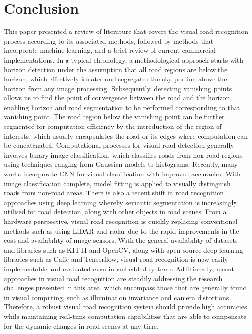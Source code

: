 \section{Conclusion} \label{secconclusion}
This paper presented a review of literature that covers the visual road recognition process according to its associated methods, followed by methods that incorporate machine learning, and a brief review of current commercial implementations. In a typical chronology, a methodological approach starts with horizon detection under the assumption that all road regions are below the horizon, which effectively isolates and segregates the sky portion above the horizon from any image processing. Subsequently, detecting vanishing points allows us to find the point of convergence between the road and the horizon, enabling horizon and road segmentation to be performed corresponding to that vanishing point. The road region below the vanishing point can be further segmented for computation efficiency by the introduction of the region of interests, which usually encapsulates the road or its edges where computation can be concatenated. Computational processes for visual road detection generally involves binary image classification, which classifies roads from non-road regions using techniques ranging from Gaussian models to histograms. Recently, many works incorporate CNN for visual classification with improved accuracies. With image classification complete, model fitting is applied to visually distinguish roads from non-road areas. There is also a recent shift in road recognition approaches using deep learning whereby semantic segmentation is increasingly utilised for road detection, along with other objects in road scenes. From a hardware perspective, visual road recognition is quickly replacing conventional methods such as using LiDAR and radar due to the rapid improvements in the cost and availability of image sensors. With the general availability of datasets and libraries such as KITTI and OpenCV, along with open-source deep learning libraries such as Caffe and Tensorflow, visual road recognition is now easily implementable and evaluated even in embedded systems. Additionally, recent approaches in visual road recognition are steadily addressing the research challenges presented in this area, which encompass those that are generally found in visual computing, such as illumination invariance and camera distortions. Therefore, a robust visual road recognition system should provide high accuracies while maintaining real-time computation capabilities that are able to compensate for the dynamic changes in road scenes at any time.

